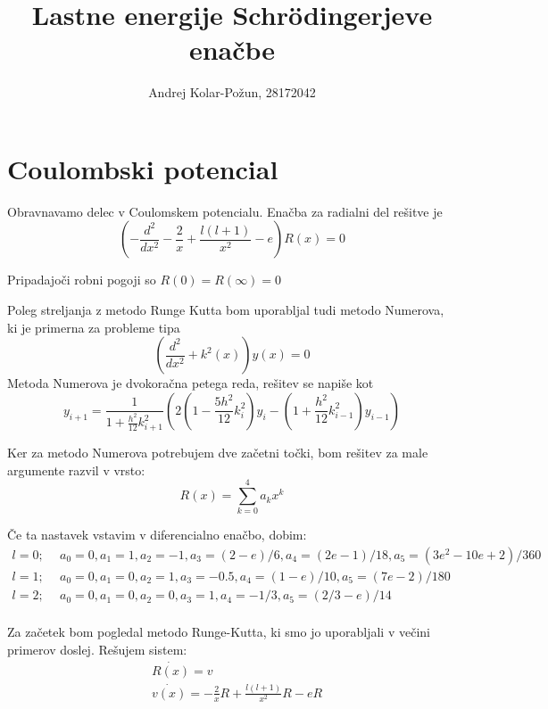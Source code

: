 \documentclass{article}
\title{Lastne energije Schrödingerjeve enačbe}
\author{Andrej Kolar-Požun, 28172042}
\begin{document}
\maketitle
\newpage
{}
\section{Coulombski potencial}
Obravnavamo delec v Coulomskem potencialu.
Enačba za radialni del rešitve je
\begin{equation*}
\left( - \frac{d^2}{dx^2} - \frac{2}{x} + \frac{l(l+1)}{x^2} - e \right) R(x) = 0
\end{equation*}

Pripadajoči robni pogoji so $R(0)=R(\infty)=0$

Poleg streljanja z metodo Runge Kutta bom uporabljal tudi metodo Numerova, ki je primerna za probleme tipa
\begin{equation*}
\left( \frac{d^2}{dx^2} + k^2(x) \right) y(x) = 0
\end{equation*}
Metoda Numerova je dvokoračna petega reda, rešitev se napiše kot
\begin{equation*}
y_{i+1} = \frac{1}{1+\frac{h^2}{12}k_{i+1}^2} \left( 2\left(1-\frac{5h^2}{12}k_i^2 \right) y_i - \left( 1 + \frac{h^2}{12}k_{i-1}^2 \right ) y_{i-1} \right)
\end{equation*}



Ker za metodo Numerova potrebujem dve začetni točki, bom rešitev za male argumente razvil v vrsto:
\begin{equation*}
R(x) = \sum_{k=0}^{4} a_k x^k
\end{equation*}

Če ta nastavek vstavim v diferencialno enačbo, dobim:
\begin{align*}
l=0;\ \  & a_0 = 0, a_1=1, a_2 = -1, a_3=(2-e)/6, a_4=(2e-1)/18, a_5 = (3e^2 - 10e + 2)/360 \\
l=1;\ \  & a_0 = 0, a_1=0, a_2 = 1, a_3=-0.5, a_4=(1-e)/10, a_5 = (7e-2)/180 \\
l=2;\ \  & a_0 = 0, a_1=0, a_2 = 0, a_3=1, a_4=-1/3, a_5 = (2/3-e)/14 \\
\end{align*}

Za začetek bom pogledal metodo Runge-Kutta, ki smo jo uporabljali v večini primerov doslej. Rešujem sistem:
\begin{align*}
&\dot{R(x)} = v\\
&\dot{v(x)} = -\frac{2}{x} R + \frac{l(l+1)}{x^2}R - e R  
\end{align*}
\end{document}
